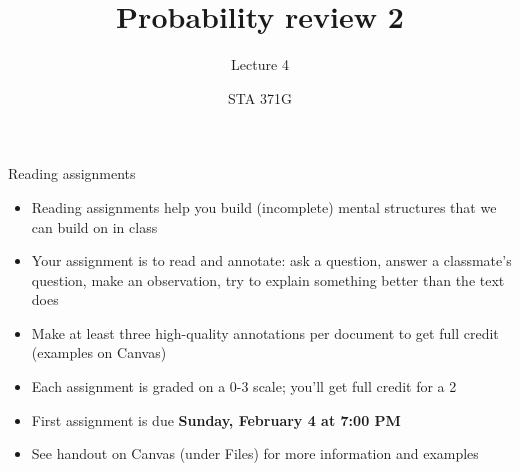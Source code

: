 \documentclass{beamer}\usepackage[]{graphicx}\usepackage[]{color}
\title{Probability review 2}
\subtitle{Lecture 4}
\author{STA 371G}
\begin{document}
\frame{\maketitle}
\begin{darkframes}

\begin{frame}{Reading assignments}
  \begin{itemize}[<+->]
    \item Reading assignments help you build (incomplete) mental structures that we can build on in class
    \item Your assignment is to read and annotate: ask a question, answer a classmate's question, make an observation, try to explain something better than the text does
    \item Make at least three high-quality annotations per document to get full credit (examples on Canvas)
    \item Each assignment is graded on a 0-3 scale; you'll get full credit for a 2
    \item First assignment is due \textbf{Sunday, February 4 at 7:00 PM}
    \item See handout on Canvas (under Files) for more information and examples
  \end{itemize}
\end{frame}


\begin{frame}
\end{frame}


\end{darkframes}
\end{document}
